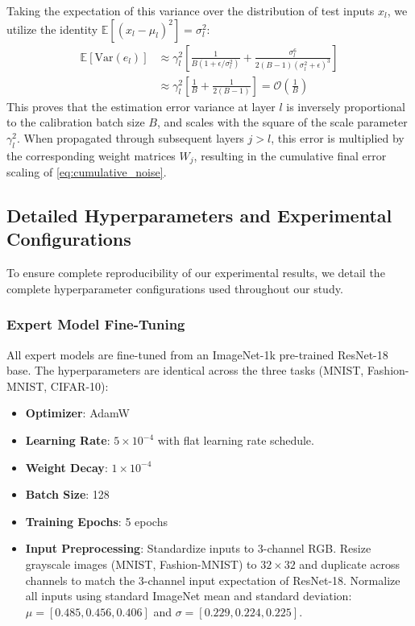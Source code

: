 \documentclass{article}
\theoremstyle{plain}
\theoremstyle{definition}
\begin{document}
Taking the expectation of this variance over the distribution of test inputs $x_l$, we utilize the identity $\mathbb{E}[(x_l - \mu_l)^2] = \sigma^2_l$:
\begin{align}
    \mathbb{E}[\text{Var}(e_l)] &\approx \gamma_l^2 \left[ \frac{1}{B(1 + \epsilon/\sigma^2_l)} + \frac{\sigma^6_l}{2(B-1)(\sigma^2_l + \epsilon)^3} \right] \\
    &\approx \gamma_l^2 \left[ \frac{1}{B} + \frac{1}{2(B-1)} \right] = \mathcal{O}\left( \frac{1}{B} \right)
\end{align}
This proves that the estimation error variance at layer $l$ is inversely proportional to the calibration batch size $B$, and scales with the square of the scale parameter $\gamma_l^2$. When propagated through subsequent layers $j > l$, this error is multiplied by the corresponding weight matrices $W_j$, resulting in the cumulative final error scaling of \cref{eq:cumulative_noise}.

\subsection{Detailed Hyperparameters and Experimental Configurations}
To ensure complete reproducibility of our experimental results, we detail the complete hyperparameter configurations used throughout our study.

\subsubsection{Expert Model Fine-Tuning}
All expert models are fine-tuned from an ImageNet-1k pre-trained ResNet-18 base. The hyperparameters are identical across the three tasks (MNIST, Fashion-MNIST, CIFAR-10):
\begin{itemize}
    \item \textbf{Optimizer}: AdamW \cite{loshchilov2017decoupled}
    \item \textbf{Learning Rate}: $5 \times 10^{-4}$ with flat learning rate schedule.
    \item \textbf{Weight Decay}: $1 \times 10^{-4}$
    \item \textbf{Batch Size}: 128
    \item \textbf{Training Epochs}: 5 epochs
    \item \textbf{Input Preprocessing}: Standardize inputs to 3-channel RGB. Resize grayscale images (MNIST, Fashion-MNIST) to $32 \times 32$ and duplicate across channels to match the 3-channel input expectation of ResNet-18. Normalize all inputs using standard ImageNet mean and standard deviation: $\mu = [0.485, 0.456, 0.406]$ and $\sigma = [0.229, 0.224, 0.225]$.
\end{itemize}
\end{document}
